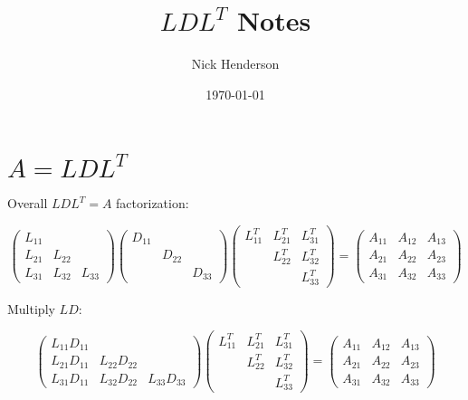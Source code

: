 \documentclass[12pt]{article}
\title{$LDL^T$ Notes}
\author{Nick Henderson}
\date{\today}
\begin{document}
\maketitle

\section{$A=LDL^T$}

Overall $LDL^T = A$ factorization:

\begin{equation*}
\begin{pmatrix}
L_{11} &        &        \\
L_{21} & L_{22} &        \\
L_{31} & L_{32} & L_{33}
\end{pmatrix}
\begin{pmatrix}
D_{11} &        &        \\
       & D_{22} &        \\
       &        & D_{33}
\end{pmatrix}
\begin{pmatrix}
L_{11}^T & L_{21}^T & L_{31}^T \\
         & L_{22}^T & L_{32}^T \\
         &          & L_{33}^T
\end{pmatrix}
= 
\begin{pmatrix}
A_{11} & A_{12} & A_{13} \\
A_{21} & A_{22} & A_{23} \\
A_{31} & A_{32} & A_{33}
\end{pmatrix}
\end{equation*}

Multiply $LD$:

\begin{equation*}
\begin{pmatrix}
L_{11} D_{11} &               &              \\
L_{21} D_{11} & L_{22} D_{22} &              \\
L_{31} D_{11} & L_{32} D_{22} & L_{33} D_{33}
\end{pmatrix}
\begin{pmatrix}
L_{11}^T & L_{21}^T & L_{31}^T \\
         & L_{22}^T & L_{32}^T \\
         &          & L_{33}^T
\end{pmatrix}
= 
\begin{pmatrix}
A_{11} & A_{12} & A_{13} \\
A_{21} & A_{22} & A_{23} \\
A_{31} & A_{32} & A_{33}
\end{pmatrix}
\end{equation*}
\end{document}
